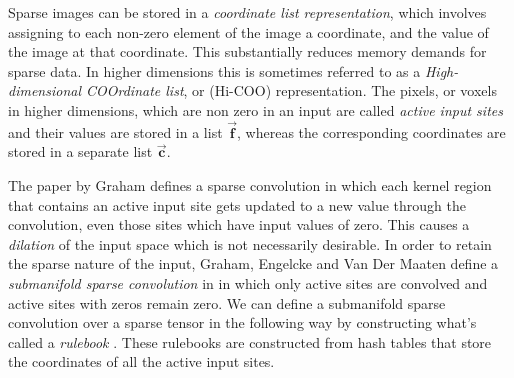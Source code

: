 \documentclass[8pt]{refart}
\begin{document}
Sparse images can be stored in a \textit{coordinate list representation}, which involves assigning to each non-zero element of the image a coordinate, and the value of the image at that coordinate.  This substantially reduces memory demands for sparse data.  In higher dimensions this is sometimes referred to as a \textit{High-dimensional COOrdinate list}, or (Hi-COO) representation.  The pixels, or voxels in higher dimensions, which are non zero in an input are called \textit{active input sites} and their values are stored in a list $\vec{\mathbf{f}}$, whereas the corresponding coordinates are stored in a separate list $\vec{\mathbf{c}}$.

The paper by Graham \cite{Graham} defines a sparse convolution in which each kernel region that contains an active input site gets updated to a new value through the convolution, even those sites which have input values of zero.  This causes a \textit{dilation} of the input space which is not necessarily desirable.  In order to retain the sparse nature of the input, Graham, Engelcke and Van Der Maaten define a \textit{submanifold sparse convolution} in \cite{SparseConvNet1} in which only active sites are convolved and active sites with zeros remain zero.  We can define a submanifold sparse convolution over a sparse tensor in the following way by constructing what's called a \textit{rulebook} \cite{SparseConvNet1}.  These rulebooks are constructed from hash tables that store the coordinates of all the active input sites.
\end{document}
